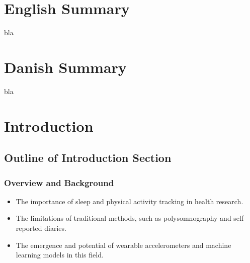 \documentclass[
  10pt,
  letterpaper,
  DIV=11,
  numbers=noendperiod]{scrartcl}
\providecommand{\tightlist}{%
  \setlength{\itemsep}{0pt}\setlength{\parskip}{0pt}}\usepackage{longtable,booktabs,array}
\begin{document}
\newpage

\hypertarget{english-summary}{%
\section{English Summary}\label{english-summary}}

bla

\newpage

\hypertarget{danish-summary}{%
\section{Danish Summary}\label{danish-summary}}

bla

\newpage

\hypertarget{introduction}{%
\section{Introduction}\label{introduction}}

\hypertarget{outline-of-introduction-section}{%
\subsection{Outline of Introduction
Section}\label{outline-of-introduction-section}}

\hypertarget{overview-and-background}{%
\subsubsection{Overview and Background}\label{overview-and-background}}

\begin{itemize}
\tightlist
\item
  The importance of sleep and physical activity tracking in health
  research.
\item
  The limitations of traditional methods, such as polysomnography and
  self-reported diaries.
\item
  The emergence and potential of wearable accelerometers and machine
  learning models in this field.
\end{itemize}
\end{document}
